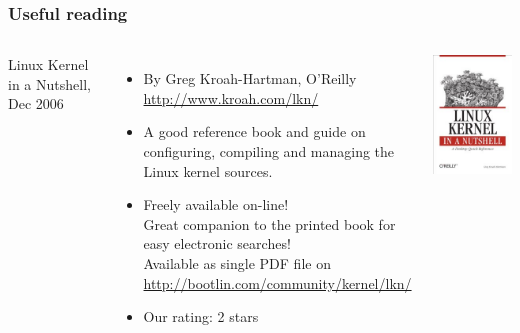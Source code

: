 \begin{frame}
  \frametitle{Useful reading}
  \begin{columns}
    Linux Kernel in a Nutshell, Dec 2006
    \begin{itemize}
    \item By Greg Kroah-Hartman, O'Reilly\\
      \url{http://www.kroah.com/lkn/}
    \item A good reference book and guide on configuring, compiling
      and managing the Linux kernel sources.
    \item Freely available on-line!\\
      Great companion to the printed book for easy electronic searches!\\
      Available as single PDF file on
      \url{http://bootlin.com/community/kernel/lkn/}
    \item Our rating: 2 stars
    \end{itemize}
    \includegraphics[width=\textwidth]{slides/sysdev-linux-intro-modules/linux-kernel-in-a-nutshell.jpg}
  \end{columns}
\end{frame}

